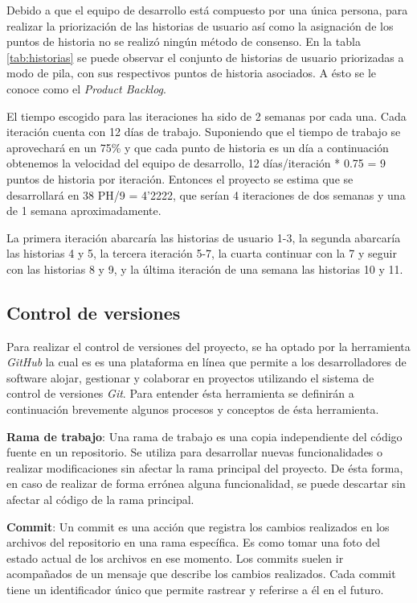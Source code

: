 Debido a que el equipo de desarrollo está compuesto por una única persona, para realizar la priorización de las historias de usuario así como la asignación de los puntos de historia no se realizó ningún método de consenso. En la tabla \ref{tab:historias} se puede observar el conjunto de historias de usuario priorizadas a modo de pila, con sus respectivos puntos de historia asociados. A ésto se le conoce como el \textit{Product Backlog}.

El tiempo escogido para las iteraciones ha sido de 2 semanas por cada una. Cada iteración cuenta con 12 días de trabajo. Suponiendo que el tiempo de trabajo se aprovechará en un 75\% y que cada punto de historia es un día a continuación obtenemos la velocidad del equipo de desarrollo, 12 días/iteración * 0.75 =  9 puntos de historia por iteración. Entonces el proyecto se estima que se desarrollará en 38 PH/9 = 4'2222, que serían 4 iteraciones de dos semanas y una de 1 semana aproximadamente.

La primera iteración abarcaría las historias de usuario 1-3, la segunda abarcaría las historias 4 y 5, la tercera iteración 5-7, la cuarta continuar con la 7 y seguir con las historias 8 y 9, y la última iteración de una semana las historias 10 y 11.

\subsection{Control de versiones}

Para realizar el control de versiones del proyecto, se ha optado por la herramienta \textit{GitHub} \cite{Github} la cual es es una plataforma en línea que permite a los desarrolladores de software alojar, gestionar y colaborar en proyectos utilizando el sistema de control de versiones \textit{Git}. Para entender ésta herramienta se definirán a continuación brevemente algunos procesos y conceptos de ésta herramienta.

\textbf{Rama de trabajo}: Una rama de trabajo es una copia independiente del código fuente en un repositorio. Se utiliza para desarrollar nuevas funcionalidades o realizar modificaciones sin afectar la rama principal del proyecto. De ésta forma, en caso de realizar de forma errónea alguna funcionalidad, se puede descartar sin afectar al código de la rama principal.

\textbf{Commit}: Un commit es una acción que registra los cambios realizados en los archivos del repositorio en una rama específica. Es como tomar una foto del estado actual de los archivos en ese momento. Los commits suelen ir acompañados de un mensaje que describe los cambios realizados. Cada commit tiene un identificador único que permite rastrear y referirse a él en el futuro.

